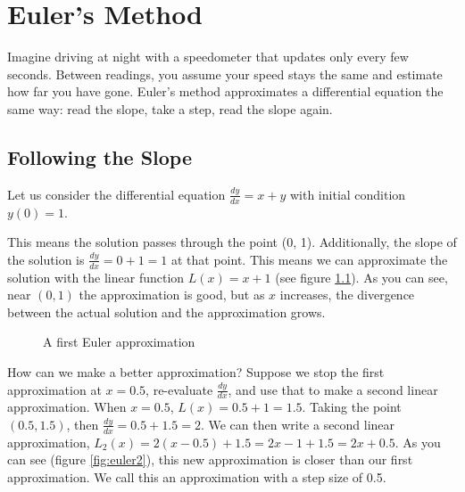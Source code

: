 \chapter{Euler's Method}
Imagine driving at night with a speedometer that updates only every few
seconds. Between readings, you assume your speed stays the same and estimate
how far you have gone. Euler's method approximates a differential equation the
same way: read the slope, take a step, read the slope again.

\section{Following the Slope}
Let us consider the differential equation 
$\frac{dy}{dx} = x + y$ with initial condition $y(0) = 1$.

This means the solution passes through the point (0, 1). Additionally, the 
slope of the solution is $\frac{dy}{dx} = 0 + 1 = 1$ at that point. This means 
we can approximate the solution with the linear function $L(x) = x + 1$ (see 
figure \ref{fig:euler1}). As you can see, near $(0,1)$ the approximation is 
good, but as $x$ increases, the divergence between the actual solution and the 
approximation grows. 

\begin{figure}[H]
\centering
{}
\caption{A first Euler approximation}
\label{fig:euler1}
\end{figure}

How can we make a better approximation? Suppose we stop the first 
approximation at $x = 0.5$, re-evaluate $\frac{dy}{dx}$, and use that to make 
a second linear approximation. When $x = 0.5$, $L(x) = 0.5 + 1 = 1.5$. Taking 
the point $(0.5, 1.5)$, then $\frac{dy}{dx} = 0.5 + 1.5 = 2$. We can then 
write a second linear approximation, $L_2(x) = 2(x - 0.5) + 1.5 = 2x - 1 + 1.5 
= 2x + 0.5$. As you can see (figure \ref{fig:euler2}), this new approximation 
is closer than our first approximation. We call this an approximation with a  
step size of 0.5.

